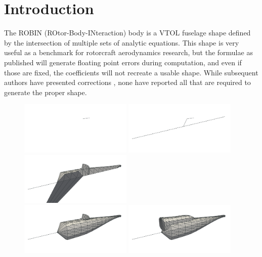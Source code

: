\documentclass[journal]{new-aiaa}
\begin{document}
\section{Introduction}
The ROBIN (ROtor-Body-INteraction) body is a VTOL fuselage shape \cite{nasa80051,nasa87762,mineckgorton,nasa1999}
defined by the intersection of multiple sets of analytic equations.
This shape is very useful as a benchmark for rotorcraft aerodynamics research, but the formulae
as published will generate floating point errors during computation,
and even if those are fixed, the coefficients will not recreate a usable shape.
While subsequent authors have presented corrections \cite{nasa87762,mineckgorton},
none have reported all that are required to generate the proper shape.
\begin{figure}[b]
\begin{centering}
\includegraphics[width=2.1in]{img_figa.png}
\includegraphics[width=2.1in]{img_figc.png}
\includegraphics[width=2.1in]{img_figd.png} \\
\includegraphics[width=2.1in]{img_fige.png}
\includegraphics[width=2.1in]{img_figf.png}

\end{centering}
\end{figure}
\end{document}
